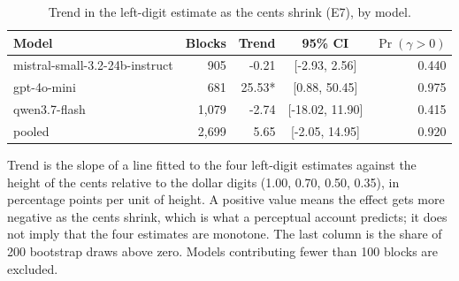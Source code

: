 \begin{table}[t]
\centering
\caption{Trend in the left-digit estimate as the cents shrink (E7), by model.}
\label{tab:vistrend}
\small
\begin{tabular}{lrrcr}
\toprule
Model & Blocks & Trend & 95\% CI & $\Pr(\gamma > 0)$ \\
\midrule
mistral-small-3.2-24b-instruct &   905 & -0.21 & [-2.93, 2.56] & 0.440 \\
gpt-4o-mini &   681 & 25.53* & [0.88, 50.45] & 0.975 \\
qwen3.7-flash & 1,079 & -2.74 & [-18.02, 11.90] & 0.415 \\
\midrule pooled & 2,699 & 5.65 & [-2.05, 14.95] & 0.920 \\
\bottomrule
\end{tabular}
\vspace{2pt}
\parbox{\linewidth}{\footnotesize Trend is the slope of a line fitted to the four left-digit estimates against the height of the cents relative to the dollar digits (1.00, 0.70, 0.50, 0.35), in percentage points per unit of height. A positive value means the effect gets more negative as the cents shrink, which is what a perceptual account predicts; it does not imply that the four estimates are monotone. The last column is the share of 200 bootstrap draws above zero. Models contributing fewer than 100 blocks are excluded.}
\end{table}
